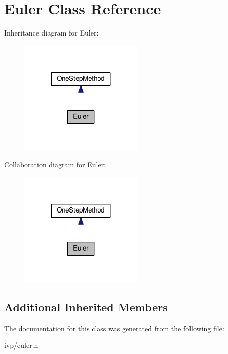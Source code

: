 \hypertarget{classEuler}{}\section{Euler Class Reference}
\label{classEuler}


Inheritance diagram for Euler\+:
\nopagebreak
\begin{figure}[H]
\begin{center}
\leavevmode
\includegraphics[width=167pt]{classEuler__inherit__graph}
\end{center}
\end{figure}


Collaboration diagram for Euler\+:
\nopagebreak
\begin{figure}[H]
\begin{center}
\leavevmode
\includegraphics[width=167pt]{classEuler__coll__graph}
\end{center}
\end{figure}
\subsection*{Additional Inherited Members}


The documentation for this class was generated from the following file\+:\begin{DoxyCompactItemize}
\item 
ivp/euler.\+h\end{DoxyCompactItemize}
